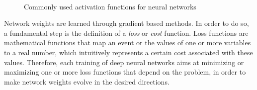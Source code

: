 \documentclass[%
    corpo=12pt,
    twoside,
    stile=classica,   
    tipotesi=magistrale,
    evenboxes,
    english,
	numerazioneromana,
]{toptesi}
\begin{document}
\begin{figure}
	\centering
	\\
	\caption{Commonly used activation functions for neural networks}
	\label{fig:act_functions}
\end{figure}

\bigskip
Network weights are learned through gradient based methods. In order to do so, a fundamental step is the definition of a \textit{loss} or \textit{cost} function. Loss functions are mathematical functions that map an event or the values of one or more variables to a real number, which intuitively represents a certain cost associated with these values. Therefore, each training of deep neural networks aims at minimizing or maximizing one or more loss functions that depend on the problem, in order to make network weights evolve in the desired directions. 
\end{document}
